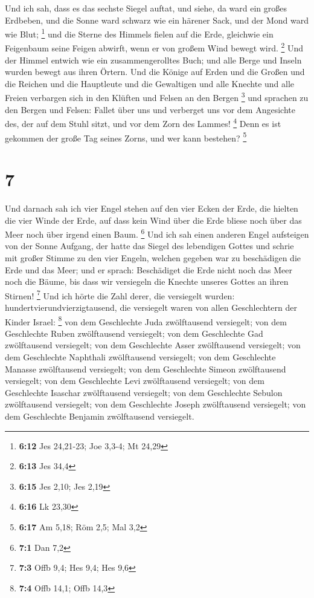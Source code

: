  Und ich sah, dass es das sechste Siegel auftat, und
siehe, da ward ein großes Erdbeben, und die Sonne ward schwarz wie ein
härener Sack, und der Mond ward wie Blut; \footnote{\textbf{6:12} Jes
  24,21-23; Joe 3,3-4; Mt 24,29}  und die Sterne des
Himmels fielen auf die Erde, gleichwie ein Feigenbaum seine Feigen
abwirft, wenn er von großem Wind bewegt wird. \footnote{\textbf{6:13}
  Jes 34,4}  Und der Himmel entwich wie ein
zusammengerolltes Buch; und alle Berge und Inseln wurden bewegt aus
ihren Örtern.  Und die Könige auf Erden und die Großen
und die Reichen und die Hauptleute und die Gewaltigen und alle Knechte
und alle Freien verbargen sich in den Klüften und Felsen an den Bergen
\footnote{\textbf{6:15} Jes 2,10; Jes 2,19}  und sprachen
zu den Bergen und Felsen: Fallet über uns und verberget uns vor dem
Angesichte des, der auf dem Stuhl sitzt, und vor dem Zorn des Lammes!
\footnote{\textbf{6:16} Lk 23,30}  Denn es ist gekommen
der große Tag seines Zorns, und wer kann bestehen? \footnote{\textbf{6:17}
  Am 5,18; Röm 2,5; Mal 3,2}

\hypertarget{section-1}{%
\section{7}\label{section-1}}

 Und darnach sah ich vier Engel stehen auf den vier Ecken
der Erde, die hielten die vier Winde der Erde, auf dass kein Wind über
die Erde bliese noch über das Meer noch über irgend einen Baum.
\footnote{\textbf{7:1} Dan 7,2}  Und ich sah einen anderen
Engel aufsteigen von der Sonne Aufgang, der hatte das Siegel des
lebendigen Gottes und schrie mit großer Stimme zu den vier Engeln,
welchen gegeben war zu beschädigen die Erde und das Meer; 
und er sprach: Beschädiget die Erde nicht noch das Meer noch die Bäume,
bis dass wir versiegeln die Knechte unseres Gottes an ihren Stirnen!
\footnote{\textbf{7:3} Offb 9,4; Hes 9,4; Hes 9,6}  Und
ich hörte die Zahl derer, die versiegelt wurden:
hundertvierundvierzigtausend, die versiegelt waren von allen
Geschlechtern der Kinder Israel: \footnote{\textbf{7:4} Offb 14,1; Offb
  14,3}  von dem Geschlechte Juda zwölftausend versiegelt;
von dem Geschlechte Ruben zwölftausend versiegelt; von dem Geschlechte
Gad zwölftausend versiegelt;  von dem Geschlechte Asser
zwölftausend versiegelt; von dem Geschlechte Naphthali zwölftausend
versiegelt; von dem Geschlechte Manasse zwölftausend versiegelt;
 von dem Geschlechte Simeon zwölftausend versiegelt; von
dem Geschlechte Levi zwölftausend versiegelt; von dem Geschlechte
Isaschar zwölftausend versiegelt;  von dem Geschlechte
Sebulon zwölftausend versiegelt; von dem Geschlechte Joseph zwölftausend
versiegelt; von dem Geschlechte Benjamin zwölftausend versiegelt.

